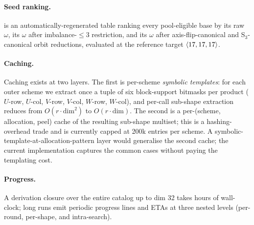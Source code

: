 \paragraph{Seed ranking.}  is an
automatically-regenerated table ranking every pool-eligible base by
its raw \(\omega\), its \(\omega\) after imbalance-\(\le 3\)
restriction, and its \(\omega\) after axis-flip-canonical and
S\(_3\)-canonical orbit reductions, evaluated at the reference target
\(\langle 17, 17, 17 \rangle\).

\paragraph{Caching.} Caching exists at two layers. The first is
per-scheme \emph{symbolic templates}: for each outer scheme we extract
once a tuple of six block-support bitmasks per product (\(U\)-row,
\(U\)-col, \(V\)-row, \(V\)-col, \(W\)-row, \(W\)-col), and per-call
sub-shape extraction reduces from \(O(r \cdot \text{dim}^2)\) to
\(O(r \cdot \text{dim})\). The second is a per-(scheme, allocation,
peel) cache of the resulting sub-shape multiset; this is a
hashing-overhead trade and is currently capped at 200k entries per
scheme. A symbolic-template-at-allocation-pattern layer would
generalise the second cache; the current implementation captures the
common cases without paying the templating cost.

\paragraph{Progress.} A derivation closure over the entire catalog up to
dim 32 takes hours of wall-clock; long runs emit periodic progress
lines and ETAs at three nested levels (per-round, per-shape, and
intra-search).
